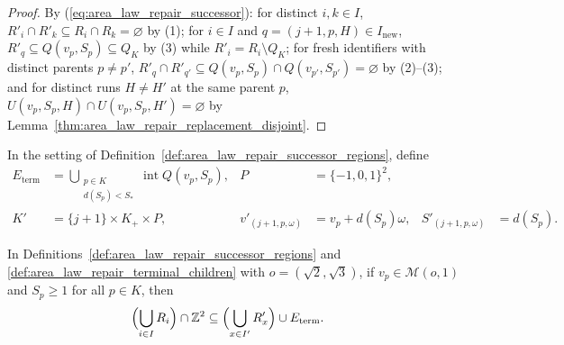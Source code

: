 \begin{proof}\leanok
    By (\ref{eq:area_law_repair_successor}): for distinct $i,k\in I$, $R'_i\cap R'_k\subseteq R_i\cap R_k=\varnothing$
    by (1); for $i\in I$ and $q=(j+1,p,H)\in I_{\mathrm{new}}$, $R'_q\subseteq Q(v_p,S_p)\subseteq Q_K$ by (3)
    while $R'_i=R_i\setminus Q_K$; for fresh identifiers with distinct parents $p\ne p'$,
    $R'_q\cap R'_{q'}\subseteq Q(v_p,S_p)\cap Q(v_{p'},S_{p'})=\varnothing$ by (2)--(3); and for
    distinct runs $H\ne H'$ at the same parent $p$, $U(v_p,S_p,H)\cap U(v_p,S_p,H')=\varnothing$
    by Lemma~\ref{thm:area_law_repair_replacement_disjoint}.
\end{proof}

\begin{definition}
    \label{def:area_law_repair_terminal_children}
    \leanok
    In the setting of Definition~\ref{def:area_law_repair_successor_regions}, define
    \begin{align}
        E_{\mathrm{term}}
                            & =\bigcup_{\substack{p\in K    \\d(S_p)<S_*}}\operatorname{int}Q(v_p,S_p), &
        P                   & =\{-1,0,1\}^2,                \\
        K'                  & =\{j+1\}\times K_+\times P, &
        v'_{(j+1,p,\omega)} & =v_p+d(S_p)\omega,          &
        S'_{(j+1,p,\omega)} & =d(S_p).
        \label{eq:area_law_repair_next_marks}
    \end{align}
\end{definition}

\begin{lemma}
    \label{thm:area_law_repair_next_lattice_cover}
    \leanok
    In Definitions~\ref{def:area_law_repair_successor_regions} and
    \ref{def:area_law_repair_terminal_children} with $o=(\sqrt2,\sqrt3)$, if $v_p\in\mathcal M(o,1)$
    and $S_p\ge1$ for all $p\in K$, then
    \begin{align}
        \Bigl(\bigcup_{i\in I}R_i\Bigr)\cap\mathbb Z^2
         & \subseteq\Bigl(\bigcup_{x\in I'}R'_x\Bigr)\cup E_{\mathrm{term}}.
        \label{eq:area_law_repair_next_lattice_cover}
    \end{align}
\end{lemma}

